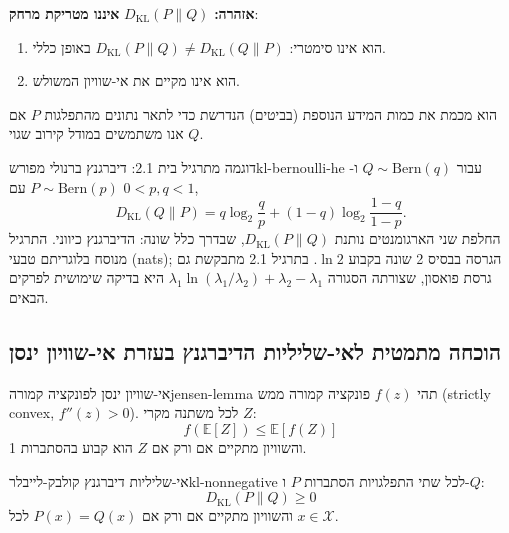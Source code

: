 \textbf{אזהרה:} $D_{\mathrm{KL}}(P \parallel Q)$ \textbf{איננו מטריקת מרחק}:
\begin{enumerate}
\item הוא אינו סימטרי: $D_{\mathrm{KL}}(P \parallel Q) \ne D_{\mathrm{KL}}(Q \parallel P)$ באופן כללי.
\item הוא אינו מקיים את אי-שוויון המשולש.
\end{enumerate}
הוא מכמת את כמות המידע הנוספת (בביטים) הנדרשת כדי לתאר נתונים מהתפלגות $P$ אם אנו משתמשים במודל קירוב שגוי $Q$.

\begin{example}{דוגמה מתרגיל בית 2.1: דיברגנץ ברנולי מפורש}{kl-bernoulli-he}
עבור $Q\sim\mathrm{Bern}(q)$ ו-$P\sim\mathrm{Bern}(p)$ עם $0<p,q<1$,
\begin{equation}\label{eq:kl-bernoulli-he}
D_{\mathrm{KL}}(Q\parallel P)=q\log_2\frac{q}{p}+(1-q)\log_2\frac{1-q}{1-p}.
\end{equation}
החלפת שני הארגומנטים נותנת $D_{\mathrm{KL}}(P\parallel Q)$, שבדרך כלל שונה: הדיברגנץ כיווני. התרגיל מנוסח בלוגריתם טבעי (nats); הגרסה בבסיס 2 שונה בקבוע $\ln2$. בתרגיל 2.1 מתבקשת גם גרסת פואסון, שצורתה הסגורה $\lambda_1\ln(\lambda_1/\lambda_2)+\lambda_2-\lambda_1$ היא בדיקה שימושית לפרקים הבאים.
\end{example}

\subsection{הוכחה מתמטית לאי-שליליות הדיברגנץ בעזרת אי-שוויון ינסן}

\begin{lemma}{אי-שוויון ינסן לפונקציה קמורה}{jensen-lemma}
תהי $f(z)$ פונקציה קמורה ממש (\textenglish{strictly convex}, $f''(z) > 0$). לכל משתנה מקרי $Z$:
\begin{equation}\label{eq:jensen}
f(\mathbb{E}[Z]) \le \mathbb{E}[f(Z)]
\end{equation}
והשוויון מתקיים אם ורק אם $Z$ הוא קבוע בהסתברות 1.
\end{lemma}

\begin{theorem}{אי-שליליות דיברגנץ קולבק-לייבלר}{kl-nonnegative}
לכל שתי התפלגויות הסתברות $P$ ו-$Q$:
\begin{equation}\label{eq:kl-positive}
\boxed{D_{\mathrm{KL}}(P \parallel Q) \ge 0}
\end{equation}
והשוויון מתקיים אם ורק אם $P(x) = Q(x)$ לכל $x \in \mathcal{X}$.
\end{theorem}

